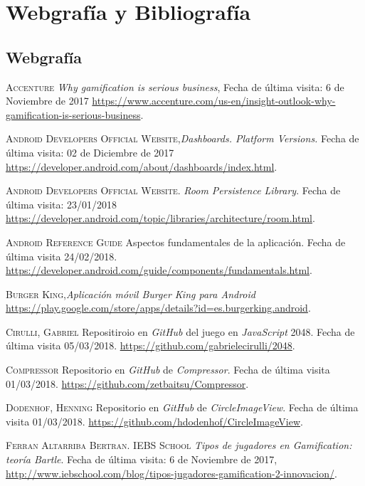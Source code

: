 \documentclass[twoside]{report}
\begin{document}
\chapter{Webgrafía y Bibliografía}

\begin{thebibliography}{a} 
\section{Webgrafía}

 \textsc{Accenture} \textit{Why gamification is serious business}, Fecha de última visita: 6 de Noviembre de 2017 \url{https://www.accenture.com/us-en/insight-outlook-why-gamification-is-serious-business}.  

 \textsc{Android Developers Official Website},\textit{Dashboards. Platform Versions.} Fecha de última visita: 02 de Diciembre de 2017 \url{https://developer.android.com/about/dashboards/index.html}.

 \textsc{Android Developers Official Website}. \textit{Room Persistence Library}. Fecha de última visita: 23/01/2018 \url{https://developer.android.com/topic/libraries/architecture/room.html}.

 \textsc{Android Reference Guide} Aspectos fundamentales de la aplicación. Fecha de última visita 24/02/2018. \url{https://developer.android.com/guide/components/fundamentals.html}.

 \textsc{Burger King},\textit{Aplicación móvil Burger King para \textit{Android}} \url{https://play.google.com/store/apps/details?id=es.burgerking.android}.

 \textsc{Cirulli, Gabriel} 
Repositiroio en \textit{GitHub} del juego en \textit{JavaScript} 2048. Fecha de última visita 05/03/2018. \url{https://github.com/gabrielecirulli/2048}.

 \textsc{Compressor} 
Repositorio en \textit{GitHub} de \textit{Compressor}. Fecha de última visita 01/03/2018. \url{https://github.com/zetbaitsu/Compressor}.

 \textsc{Dodenhof, Henning} 
Repositorio en \textit{GitHub} de \textit{CircleImageView}. Fecha de última visita 01/03/2018. \url{https://github.com/hdodenhof/CircleImageView}.

 \textsc{Ferran Altarriba Bertran. IEBS School} \textit{Tipos de jugadores en \textit{Gamification}: teoría Bartle}. Fecha de última visita: 6 de Noviembre de 2017, \url{http://www.iebschool.com/blog/tipos-jugadores-gamification-2-innovacion/}.  


\end{thebibliography}
\end{document}
